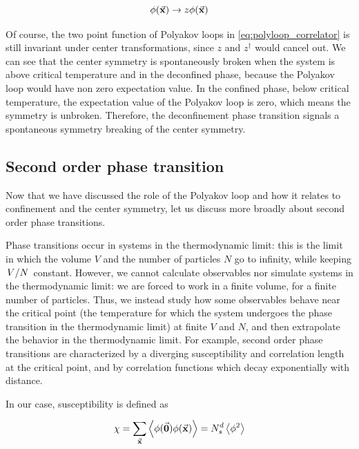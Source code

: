 \documentclass[reqno,12pt]{article}
\numberwithin{equation}{section}
\begin{document}
\begin{equation} \label{eq:polyloop_center_trans}
	\phi(\va{x}) \rightarrow z \phi(\va{x})
\end{equation}

Of course, the two point function of Polyakov loops in \eqref{eq:polyloop_correlator} is still invariant under center
transformations, since $z$ and $z^\dagger$ would cancel out. We can see that the center symmetry is spontaneously broken
when the system is above critical temperature and in the deconfined phase, because the Polyakov loop would have non zero 
expectation value. In the confined phase, below critical temperature, the expectation value of the Polyakov loop
is zero, which means the symmetry is unbroken. Therefore, the deconfinement phase transition signals a spontaneous symmetry
breaking of the center symmetry.  

\subsection{Second order phase transition} \label{phase_transition}

Now that we have discussed the role of the Polyakov loop and how it relates to confinement and the center symmetry, let us
discuss more broadly about second order phase transitions.

Phase transitions occur in systems in the thermodynamic limit: this is the limit in which the volume $V$ and
the number of particles $N$ go to infinity, while keeping $\flatfrac{V}{N}$ constant. However, we cannot calculate
observables nor simulate systems in the thermodynamic limit: we are forced to work in a finite volume, 
for a finite number of particles.
Thus, we instead study how some observables behave near the critical point (the temperature for which the system undergoes
the phase transition in the thermodynamic limit) at finite $V$ and $N$, and then extrapolate the behavior in the
thermodynamic limit. For example, second order phase transitions are characterized by a diverging susceptibility
and correlation length at the critical point, and by correlation functions which decay exponentially with distance. 

In our case, susceptibility is defined as

\begin{equation} \label{eq:susc_definition}
	\chi = \sum_{\va{x}} \expval{\phi(\va{0}) \phi(\va{x})} = N_s^d \expval{\phi^2}
\end{equation}
\end{document}
